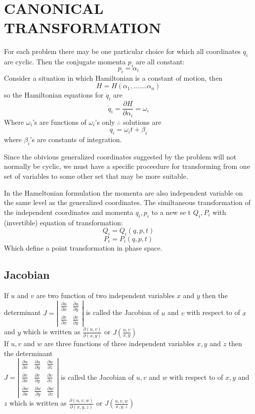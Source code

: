 \chapter{CANONICAL TRANSFORMATION}
For each problem there may be one particular choice for which all coordinates $q_i$ are cyclic. Then the conjugate momenta $p_i$ are all constant:
$$p_i=\alpha_i$$
Consider a situation in which Hamiltonian is a constant of motion,
then 
$$H=H(\alpha_1,.......\alpha_n)$$
so the Hamiltonian equations for $\dot{q}_i$ are 
$$\dot{q}_i=\frac{\partial H}{\partial \alpha_i}=\omega_i$$
Where $\omega_i$'s are functions of $\omega_i$'s only 
$\therefore $ solutions are
$$ q_i=\omega_i t+\beta_i$$
where $\beta_i$'s are constants of integration.\\
\par Since the obivious generalized coordinates suggested by the problem will
not normally be cyclic, we must have a specific proceedure for transforming from one set of variables to some other set that may be more suitable.\\
\par In the Hameltonian formulation the momenta are also independent variable on the same level as the generalized coordinates. The similtaneous transformation of the independent coordinates and momenta $q_i,p_i$ to a new se t  $Q_i,P_i$ with (invertible) equation of transformation:
$$Q_i=Q_i (q,p,t)$$
$$P_i=P_i (q,p,t)$$
Which define a point transformation in phase space.
\section{Jacobian}
If $u$ and $v$ are two function of two independent variables $x$ and $y$ then the determinant $J=\left|\begin{array}{ll}\frac{\partial u}{\partial x} & \frac{\partial u}{\partial y} \\ \frac{\partial v}{\partial x} & \frac{\partial v}{\partial y}\end{array}\right|$ is called the Jacobian of $u$ and $v$ with respect to of $x$ and $y$ which is written as $\frac{\partial(u, v)}{\partial(x, y)}$ or $J\left(\frac{u, v}{x, y}\right)$\\
If $u, v$ and $w$ are three functions of three independent variables $x, y$ and $z$ then the determinant\\
$J=\left|\begin{array}{lll}\frac{\partial u}{\partial x} & \frac{\partial u}{\partial y} & \frac{\partial u}{\partial z} \\ \frac{\partial v}{\partial x} & \frac{\partial v}{\partial y} & \frac{\partial v}{\partial z} \\ \frac{\partial w}{\partial x} & \frac{\partial w}{\partial y} & \frac{\partial w}{\partial z}\end{array}\right|$
is called the Jacobian of $u, v$ and $w$ with respect to of $x, y$ and $z$
which is written as $\frac{\partial(u, v, w)}{\partial(x, y, z)}$ or $J\left(\frac{u, v, w}{x, y, z}\right)$

